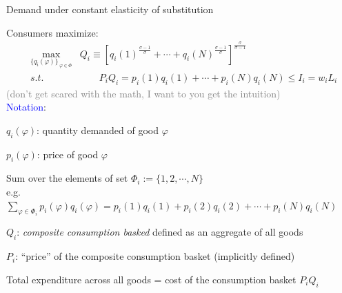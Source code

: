 \documentclass[notes,11pt, aspectratio=169, xcolor=table]{beamer}
\newcommand{\blue}[1]{\textcolor{blue}{#1}}
\newenvironment{wideitemize}{\itemize\addtolength{\itemsep}{10pt}}{\enditemize}
\begin{document}
\begin{frame}{Demand under constant elasticity of substitution}

\begin{wideitemize}
        \item Consumers maximize:
        \begin{eqnarray*}
            &\max_{\{q_i(\varphi)\}_{\
        \varphi \in \Phi}}& Q_i \equiv \left[ q_i(1)^{\tfrac{\sigma-1}{\sigma}} + \cdots +q_i(
        N)^{\tfrac{\sigma-1}{\sigma}} \right]^{\tfrac{\sigma}{\sigma-1} } \\
        &s.t.& \qquad  P_i Q_i = p_i(1) q_i(1) + \cdots + p_i(N) q_i(N)\le I_i = w_i L_i 
        \end{eqnarray*}
        \textcolor{gray}{\scriptsize (don't get scared with the math, I want to you get the intuition)} \\
\blue{Notation}:
        \begin{wideitemize}
            \item<2-> $q_i(\varphi)$: quantity demanded of good $\varphi$
            \item<2-> $p_i(\varphi)$: price of good $\varphi$
            \item<3-> Sum over the elements of set $\Phi_i:=\{1, 2, \cdots, N\}$ \\
            \qquad e.g. $\sum_{\varphi \in \Phi_i } p_i(\varphi) q_i(\varphi) = p_i(1) q_i(1) + p_i(2) q_i(2) + \cdots + p_i(N) q_i(N)$
            \item<4-> $Q_i$: \textit{composite consumption basked} defined as an aggregate of all goods
            \item<5-> $P_i$: ``price'' of the composite consumption basket (implicitly defined)
            \item<5-> Total expenditure across all goods = cost of the consumption basket  $P_i Q_i$
        \end{wideitemize}
        
\end{wideitemize}
    
\end{frame}
\end{document}
